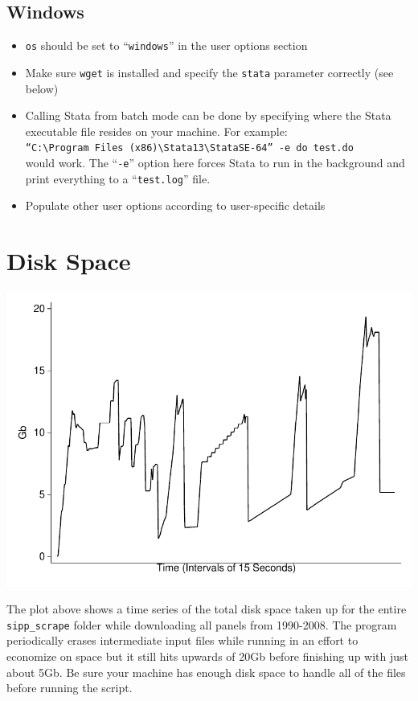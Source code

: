 \documentclass{article}
\begin{document}
\subsection{Windows}
	\begin{itemize}
	\item {\tt os} should be set to ``{\tt windows}'' in the user options section
	\item Make sure {\tt wget} is installed and specify the {\tt stata} parameter correctly (see below)
	\item Calling Stata from batch mode can be done by specifying where the Stata executable file resides on your machine. For example: \\
	{\tt ``C:{\textbackslash}Program Files (x86){\textbackslash}Stata13{\textbackslash}StataSE-64'' -e do test.do}\\
	would work. The ``{\tt -e}'' option here forces Stata to run in the background and print everything to a ``{\tt test.log}'' file.
	\item Populate other user options according to user-specific details
	\end{itemize}

\newpage
\section{Disk Space}
\begin{center}
\includegraphics{sipp_disk_space.pdf}
\end{center}
The plot above shows a time series of the total disk space taken up for the entire {\tt sipp\_scrape} folder while downloading all panels from 1990-2008. The program periodically erases intermediate input files while running in an effort to economize on space but it still hits upwards of 20Gb before finishing up with just about 5Gb. Be sure your machine has enough disk space to handle all of the files before running the script. 
\end{document}
